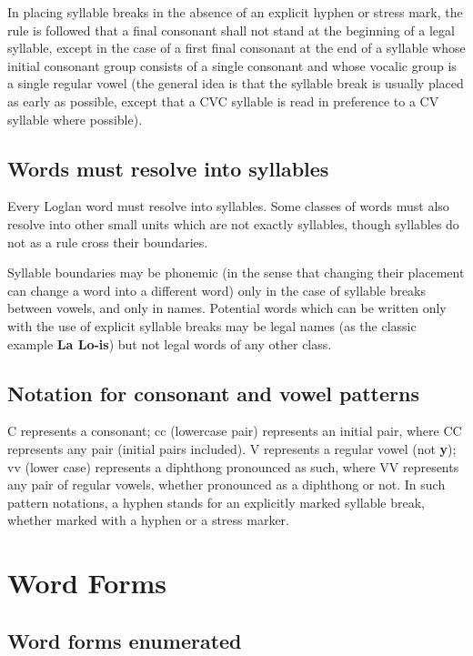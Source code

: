 \documentclass[12pt]{book}
\begin{document}
\begin{enumerate}
In placing syllable breaks in the absence of an explicit hyphen or stress mark, the rule is followed that a final consonant shall not stand at the beginning of a legal syllable, except in the case of a first final consonant at the end of a syllable whose initial consonant group consists of a single consonant and whose vocalic group is a single regular vowel (the general idea is that the syllable break is usually placed as early as possible, except that a CVC syllable is read in preference to a CV syllable where possible).   

\end{enumerate}

\subsection{Words must resolve into syllables}

Every Loglan word must resolve into syllables.  Some classes of words must also resolve into other small units which are not exactly syllables, though syllables do not as a rule cross their boundaries.

Syllable boundaries may be phonemic (in the sense that changing their placement can change a word into a different word) only in the case of syllable breaks between vowels, and only in names.   Potential words which can be written only with the use of explicit syllable breaks may be legal names (as the classic example {\bf La Lo-is}) but not legal words of any other class.

\subsection{Notation for consonant and vowel patterns}

C represents a consonant; cc (lowercase pair) represents an initial pair, where CC represents any pair (initial pairs included).  V represents a regular vowel (not {\bf y}); vv (lower case) represents a diphthong pronounced as such, where VV represents any pair of regular vowels, whether pronounced as a diphthong or not.  In such pattern notations, a hyphen stands for an explicitly marked syllable break, whether marked with a hyphen or a stress marker.

\section{Word Forms}

\subsection{Word forms enumerated}
\end{document}
